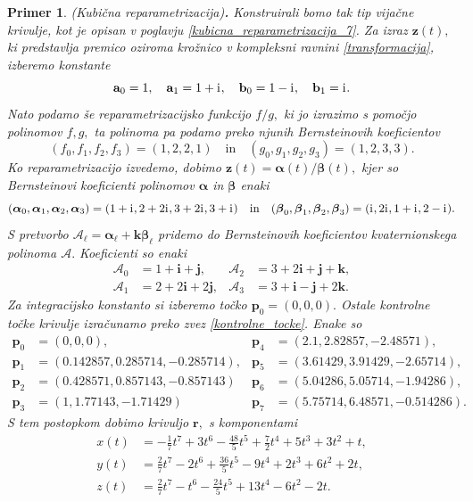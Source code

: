 \documentclass[12pt,a4paper,twoside]{article}
\newcommand{\iu}{\mathrm{i}\mkern1mu} %
\theoremstyle{definition} %
\theoremstyle{plain} %
\theoremstyle{primerstyle}
\newtheorem{primer}[definicija]{Primer}
\numberwithin{equation}{section}  %
\newcommand{\aV}{\mathbf{a}}
\newcommand{\bV}{\mathbf{b}}
\newcommand{\pV}{\mathbf{p}}
\newcommand{\rV}{\mathbf{r}}
\newcommand{\iV}{\mathbf{i}}
\newcommand{\jV}{\mathbf{j}}
\newcommand{\kV}{\mathbf{k}}
\newcommand{\zV}{\mathbf{z}}
\newcommand{\AQ}{\mathcal{A}}
\newcommand{\balpha}{\boldsymbol \alpha}
\newcommand{\bbeta}{\boldsymbol \beta}
\begin{document}
\begin{primer}
	\textnormal{ }(Kubična reparametrizacija)\textbf{.}
	Konstruirali bomo tak tip vijačne krivulje, kot je opisan v poglavju \ref{kubicna_reparametrizacija_7}. Za izraz $\zV(t),$ ki predstavlja premico oziroma krožnico v kompleksni ravnini \eqref{transformacija}, izberemo konstante
	\begin{equation*}
		\aV_0=1,\quad\aV_1=1+\iu,\quad\bV_0=1-\iu,\quad\bV_1=\iu.
	\end{equation*}
	Nato podamo še reparametrizacijsko funkcijo $f/g,$ ki jo izrazimo s pomočjo polinomov $f,g,$ ta polinoma pa podamo preko njunih Bernsteinovih koeficientov $$(f_0,f_1,f_2,f_3)=(1,2,2,1)\quad\text{in}\quad(g_0,g_1,g_2,g_3)=(1,2,3,3).$$ Ko reparametrizacijo izvedemo, dobimo $\zV(t)=\balpha(t)/\bbeta(t),$ kjer so Bernsteinovi koeficienti polinomov $\balpha$ in $\bbeta$ enaki $$(\balpha_0,\balpha_1,\balpha_2,\balpha_3)=(1+\iu,2+2\iu,3+2\iu,3+\iu)\quad\text{in}\quad(\bbeta_0,\bbeta_1,\bbeta_2,\bbeta_3)=(\iu,2\iu,1+\iu,2-\iu).$$ S pretvorbo $\AQ_\ell=\balpha_\ell+\kV\bbeta_\ell$ pridemo do Bernsteinovih koeficientov kvaternionskega polinoma $\AQ.$ Koeficienti so enaki
	\begin{align*}
		\AQ_0&=1+\iV+\jV,&\AQ_2&=3+2\iV+\jV+\kV,\\
		\AQ_1&=2+2\iV+2\jV,&\AQ_3&=3+\iV-\jV+2\kV.
	\end{align*}
	Za integracijsko konstanto si izberemo točko $\pV_0=(0,0,0).$ Ostale kontrolne točke krivulje izračunamo preko zvez \eqref{kontrolne_tocke}. Enake so
	\begin{align*}
		\pV_0&=(0,0,0),&\pV_4&=(2.1, 2.82857, -2.48571),\\
		\pV_1&=(0.142857, 0.285714, -0.285714),&\pV_5&=(3.61429, 3.91429, -2.65714),\\
		\pV_2&=(0.428571, 0.857143, -0.857143)&\pV_6&=(5.04286, 5.05714, -1.94286),\\
		\pV_3&=(1, 1.77143, -1.71429)&\pV_7&=(5.75714, 6.48571, -0.514286).
	\end{align*}
	S tem postopkom dobimo krivuljo $\rV,$ s komponentami
	\begin{align*}
		x(t)&=-\frac{1}{7}t^7+3t^6-\frac{48}{5}t^5+\frac{7}{2}t^4+5t^3+3t^2+t,\\
		y(t)&=\frac{2}{7}t^7-2t^6+\frac{36}{5}t^5-9t^4+2t^3+6t^2+2t,\\
		z(t)&=\frac{2}{7}t^7-t^6-\frac{24}{5}t^5+13t^4-6t^2-2t.
	\end{align*}
	\begin{figure}[h!]
	  \centering

\end{figure}
\end{primer}
\end{document}
